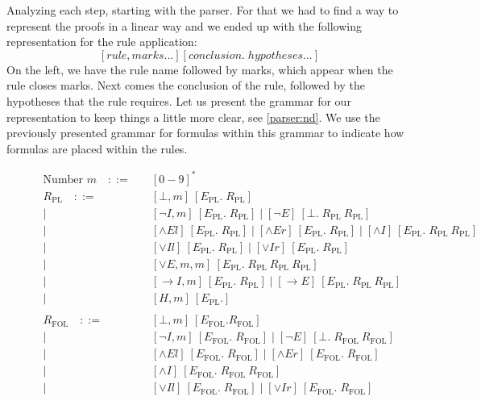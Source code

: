 Analyzing each step, starting with the parser. For that we had to find a way to represent the proofs in a linear way and we ended up with the following representation for the rule application:
\[
    [rule, marks...] [conclusion.\; hypotheses...]
\]
On the left, we have the rule name followed by marks, which appear when the rule closes marks. Next comes the conclusion of the rule, followed by the hypotheses that the rule requires. Let us present the grammar for our representation to keep things a little more clear, see \autoref{parser:nd}. We use the previously presented grammar for formulas within this grammar to indicate how formulas are placed within the rules.

\begin{figure}[H]
\centering
{
\begin{align*}
\text{Number } m \quad ::= &\quad [0-9]^* \\
R_\text{PL} \quad ::= &\quad [\bot, m]\ [E_\text{PL}.\;R_\text{PL}] \\
       \mid &\quad [\lnot I, m]\ [E_\text{PL}.\;R_\text{PL}] \mid [\lnot E]\ [\bot.\;R_\text{PL}\ R_\text{PL}] \\
       \mid &\quad [\land El]\ [E_\text{PL}.\;R_\text{PL}] \mid [\land Er]\ [E_\text{PL}.\;R_\text{PL}] \mid [\land I]\ [E_\text{PL}.\;R_\text{PL}\ R_\text{PL}] \\
       \mid &\quad [\lor Il]\ [E_\text{PL}.\;R_\text{PL}] \mid [\lor Ir]\ [E_\text{PL}.\;R_\text{PL}] \\
       \mid &\quad [\lor E, m, m]\ [E_\text{PL}.\;R_\text{PL}\ R_\text{PL}\ R_\text{PL}] \\
       \mid &\quad [\to\!I, m]\ [E_\text{PL}.\;R_\text{PL}] \mid [\to\!E]\ [E_\text{PL}.\;R_\text{PL}\ R_\text{PL}] \\
       \mid &\quad [H, m]\ [E_\text{PL}.] \\
\\
R_\text{FOL} \quad ::= &\quad [\bot, m]\ [E_\text{FOL}. R_\text{FOL}] \\
       \mid &\quad [\lnot I, m]\ [E_\text{FOL}.\;R_\text{FOL}] \mid [\lnot E]\ [\bot.\;R_\text{FOL}\ R_\text{FOL}] \\
       \mid &\quad [\land El]\ [E_\text{FOL}.\;R_\text{FOL}] \mid [\land Er]\ [E_\text{FOL}.\;R_\text{FOL}] \\
       \mid &\quad [\land I]\ [E_\text{FOL}.\;R_\text{FOL}\ R_\text{FOL}] \\
       \mid &\quad [\lor Il]\ [E_\text{FOL}.\;R_\text{FOL}] \mid [\lor Ir]\ [E_\text{FOL}.\;R_\text{FOL}] \\

\end{align*}}
\end{figure}
